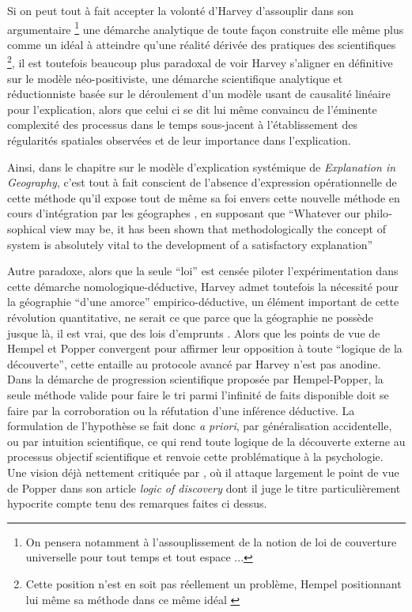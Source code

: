 Si on peut tout à fait accepter la volonté d'Harvey d'assouplir dans son argumentaire \footnote{On pensera notamment à l'assouplissement de la notion de loi de couverture universelle pour tout temps et tout espace ... } une démarche analytique de toute façon construite elle même plus comme un idéal à atteindre qu'une réalité dérivée des pratiques des scientifiques \footnote{Cette position n'est en soit pas réellement un problème, Hempel positionnant lui même sa méthode dans ce même idéal \autocite{Besse2000}}, il est toutefois beaucoup plus paradoxal de voir Harvey s'aligner en définitive sur le modèle néo-positiviste, une démarche scientifique analytique et réductionniste \autocite[57-59]{Paterson1984} basée sur le déroulement d'un modèle usant de causalité linéaire pour l'explication, alors que celui ci se dit lui même convaincu de l'éminente complexité des processus dans le temps sous-jacent à l'établissement des régularités spatiales observées et de leur importance dans l'explication.

Ainsi, dans le chapitre sur le modèle d'explication systémique de \textit{Explanation in Geography}, c'est tout à fait conscient de l'absence d'expression opérationnelle de cette méthode qu'il expose tout de même sa foi envers cette nouvelle méthode en cours d'intégration par les géographes \autocite[449,469]{Harvey1969}, en supposant que \foreignquote{english}{Whatever our philosophical view may be, it has been shown that methodologically the concept of system is absolutely vital to the development of a satisfactory explanation} \autocite[479]{Harvey1969}

Autre paradoxe, alors que la seule \enquote{loi} est censée piloter l’expérimentation dans cette démarche nomologique-déductive, Harvey admet toutefois la nécessité pour la géographie \enquote{d'une amorce} empirico-déductive, un élément important de cette révolution quantitative, ne serait ce que parce que la géographie ne possède jusque là, il est vrai, que des lois d'emprunts \autocite[41-42]{Harvey1969}. Alors que les points de vue de Hempel et Popper convergent pour affirmer leur opposition à toute \enquote{logique de la découverte}, cette entaille au protocole avancé par Harvey n'est pas anodine. Dans la démarche de progression scientifique proposée par Hempel-Popper, la seule méthode valide pour faire le tri parmi l'infinité de faits disponible doit se faire par la corroboration ou la réfutation d'une inférence déductive. La formulation de l'hypothèse se fait donc \textit{a priori}, par généralisation accidentelle, ou par intuition scientifique, ce qui rend toute logique de la découverte externe au processus objectif scientifique et renvoie cette problématique à la psychologie. Une vision déjà nettement critiquée par \textcite{Simon1973}, où il attaque largement le point de vue de Popper dans son article \textit{logic of discovery} dont il juge le titre particulièrement hypocrite compte tenu des remarques faites ci dessus. 

